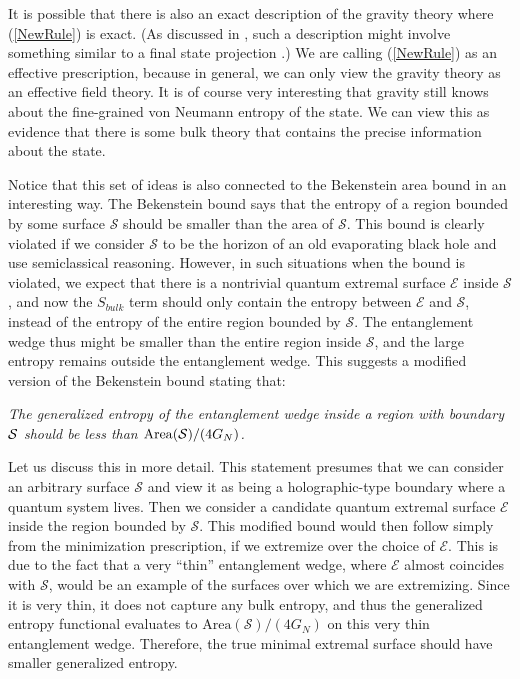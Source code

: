 \documentclass[11pt]{article}
\def\nref#1{(\ref{#1})}
\begin{document}
It is possible that there is also an exact description of the gravity theory where \nref{NewRule} is exact. 
(As discussed in \cite{Penington:2019npb}, such a description might involve something similar to a final state projection \cite{Horowitz:2003he}.)
We are calling (\ref{NewRule}) as an effective prescription, because in general, we can only view the gravity theory as an effective field theory. 
It is of course very interesting that gravity still knows about the fine-grained von Neumann entropy of the state. 
We can view this as evidence that there is some bulk theory that contains the precise information about the state. 
  
Notice that this set of ideas is also connected to the Bekenstein area bound in an interesting way. 
The Bekenstein bound says that the entropy of a region bounded by some surface $\mathcal{S}$ should be smaller than the area of $\mathcal{S}$.
This bound is clearly violated if we consider $\mathcal{S}$ to be the horizon of an old evaporating black hole and use semiclassical reasoning.
However, in such situations when the bound is violated, we expect that there is a nontrivial quantum extremal surface $\mathcal{E}$ inside $\mathcal{S}$, and now the $S_{bulk}$ term should only contain the entropy between $\mathcal{E}$ and $\mathcal{S}$, instead of the entropy of the entire region bounded by $\mathcal{S}$.
The entanglement wedge thus might be smaller than the entire region inside $\mathcal{S}$, and the large entropy remains outside the entanglement wedge. 
This suggests a modified version of the Bekenstein bound stating that:

\begin{flushleft}
{\it The generalized entropy of the entanglement wedge inside a region with boundary ${\cal S}$   should be less than ${\rm Area}({\cal S}) /(4 G_N)$.}  
\end{flushleft}

Let us discuss this in more detail. 
This statement presumes that we can consider an arbitrary surface $\mathcal{S}$ and view it as being a holographic-type boundary where a quantum system lives.
Then we consider a candidate quantum extremal surface $\mathcal{E}$ inside the region bounded by $\mathcal{S}$. 
This modified bound would then follow simply from the minimization prescription, if we extremize over the choice of $\mathcal{E}$.
This is due to the fact that a very ``thin'' entanglement wedge, where $\mathcal{E}$ almost coincides with $\mathcal{S}$, would be an example of the surfaces over which we are extremizing. 
Since it is very thin, it does not capture any bulk entropy, and thus the generalized entropy functional evaluates to $\text{Area}(\mathcal{S})/(4G_N)$ on this very thin entanglement wedge.
Therefore, the true minimal extremal surface should have smaller generalized entropy. 
 
\end{document}
